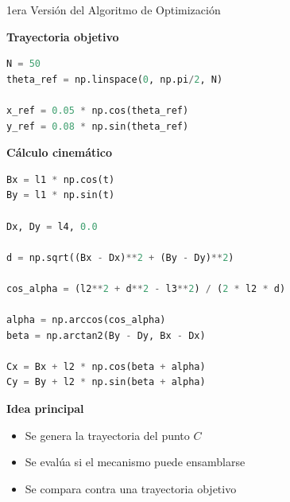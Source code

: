 \documentclass[xcolor={table,dvipsnames}]{beamer}
\begin{document}
\begin{frame}[fragile]{1era Versi\'on del Algoritmo de Optimizaci\'on}

\textbf{Trayectoria objetivo}

\begin{lstlisting}[language=Python,basicstyle=\ttfamily\tiny]
N = 50
theta_ref = np.linspace(0, np.pi/2, N)

x_ref = 0.05 * np.cos(theta_ref)
y_ref = 0.08 * np.sin(theta_ref)
\end{lstlisting}

\vspace{0.2cm}

\textbf{C\'alculo cinem\'atico}

\begin{lstlisting}[language=Python,basicstyle=\ttfamily\tiny]
Bx = l1 * np.cos(t)
By = l1 * np.sin(t)

Dx, Dy = l4, 0.0

d = np.sqrt((Bx - Dx)**2 + (By - Dy)**2)

cos_alpha = (l2**2 + d**2 - l3**2) / (2 * l2 * d)

alpha = np.arccos(cos_alpha)
beta = np.arctan2(By - Dy, Bx - Dx)

Cx = Bx + l2 * np.cos(beta + alpha)
Cy = By + l2 * np.sin(beta + alpha)
\end{lstlisting}

\vspace{0.2cm}

\textbf{Idea principal}
\scriptsize
\begin{itemize}
    \item Se genera la trayectoria del punto \(C\)
    \item Se eval\'ua si el mecanismo puede ensamblarse
    \item Se compara contra una trayectoria objetivo
\end{itemize}

\end{frame}

\end{document}
